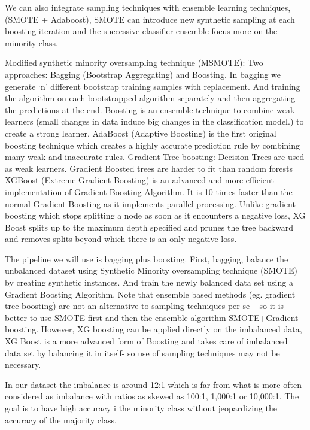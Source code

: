 \documentclass[11pt]{article}
\begin{document}
We can also integrate sampling techniques with ensemble learning techniques,  (SMOTE + Adaboost), SMOTE can introduce new synthetic sampling at each boosting iteration and the successive classifier ensemble focus more on the minority class.


Modified synthetic minority oversampling technique (MSMOTE): Two approaches: Bagging (Bootstrap Aggregating) and Boosting. In bagging we generate ‘n’ different bootstrap training samples with replacement. And training the algorithm on each bootstrapped algorithm separately and then aggregating the predictions at the end. 
Boosting is an ensemble technique to combine weak learners (small changes in data induce big changes in the classification model.) to create a strong learner. 
AdaBoost (Adaptive Boosting) is the first original boosting technique which creates a highly accurate prediction rule by combining many weak and inaccurate rules. 
Gradient Tree boosting: Decision Trees are used as weak learners. Gradient Boosted trees are harder to fit than random forests
XGBoost (Extreme Gradient Boosting) is an advanced and more efficient implementation of Gradient Boosting Algorithm. It is 10 times faster than the normal Gradient Boosting as it implements parallel processing. Unlike gradient boosting which stops splitting a node as soon as it encounters a negative loss, XG Boost splits up to the maximum depth specified and prunes the tree backward and removes splits beyond which there is an only negative loss.

The pipeline we will use is bagging plus boosting. First, bagging, balance the unbalanced dataset using Synthetic Minority oversampling technique (SMOTE) by creating synthetic instances. And train the newly balanced data set using a Gradient Boosting Algorithm. Note that ensemble based methods (eg. gradient tree boosting) are not an alternative to sampling techniques per se – so it is better to use SMOTE first and then  the ensemble algorithm SMOTE+Gradient boosting. However, XG boosting can be applied directly on the imbalanced data, XG Boost is a more advanced form of Boosting and takes care of imbalanced data set by balancing it in itself- so use of sampling techniques may not be necessary.

In our dataset the imbalance is around 12:1 which is far from what is more often considered as imbalance with ratios as skewed as 100:1, 1,000:1 or 10,000:1\cite{he2009learning}.
The goal is to have high accuracy i the minority class without jeopardizing  the accuracy of the majority class.
\end{document}
